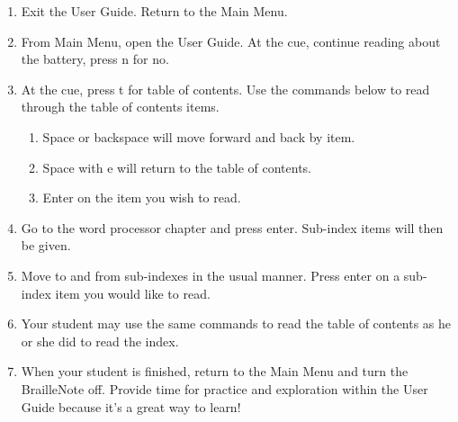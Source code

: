 \documentclass[10pt,letterpaper,twoside]{report}
\begin{document}
{{{{\begin{enumerate}
\begin{enumerate}
		      \item Space with e will exit the User Guide.
		            
		      \item To move by subsection, press space with dots4 5 6 or space with dots1 2 3.
		            
		      \item Space with dot1 and space with dot4 will move by sentence.
		            
		      \item To move by paragraph, use space with dots5 6 and space with dots2 3.
		            
		            
	      \end{enumerate}
	\item Exit the User Guide.  Return to the Main Menu.
	      
	\item From Main Menu, open the User Guide.  At the cue, continue reading about the battery, press n for no.
	      
	\item At the cue, press t for table of contents.  Use the commands below to read through the table of contents items.
	      
	      \begin{enumerate}
		      \item Space or backspace will move forward and back by item.
		            
		      \item Space with e will return to the table of contents.
		            
		      \item Enter on the item you wish to read.
		            
		            
	      \end{enumerate}
	\item Go to the word processor chapter and press enter.  Sub-index items will then be given.
	      
	\item Move to and from sub-indexes in the usual manner.  Press enter on a sub-index item you would like to read.
	      
	\item Your student may use the same commands to read the table of contents as he or she did to read the index.
	      
	\item When your student is finished, return to the Main Menu and turn the BrailleNote off.  Provide time for practice and exploration within the User Guide because it's a great way to learn!
\end{enumerate}





}}}}
\end{document}
